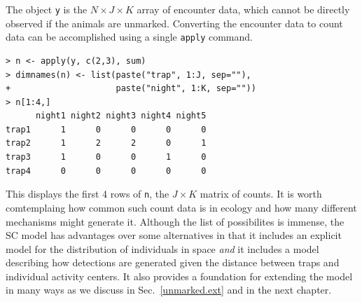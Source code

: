 The object \verb+y+ is the $N \times J \times K$ array of encounter
data, which cannot be directly observed if the animals are unmarked.
Converting the encounter data to count data can be accomplished using a single
\verb+apply+ command.
\begin{small}
\begin{verbatim}
> n <- apply(y, c(2,3), sum)
> dimnames(n) <- list(paste("trap", 1:J, sep=""),
+                     paste("night", 1:K, sep=""))
> n[1:4,]
      night1 night2 night3 night4 night5
trap1      1      0      0      0      0
trap2      1      2      2      0      1
trap3      1      0      0      1      0
trap4      0      0      0      0      0
\end{verbatim}
\end{small}
This displays the first 4 rows of \verb+n+, the $J \times K$
matrix of counts. It is worth comtemplaing how common such count data
is in
ecology and how many different mechanisms might generate it. Although
the list of possibilites is immense, the SC model has advantages over
some alternatives
in that it includes an explicit
model for the distribution of individuals in space \textit{and} it
includes a model describing how detections are generated given the
distance between traps and individual activity centers. It also
provides a foundation for extending the model in many ways as we
discuss in Sec.~\ref{unmarked.ext} and in the next chapter.

